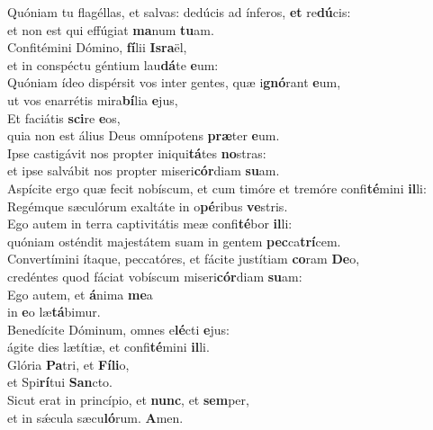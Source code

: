 \evenverse Quóniam tu flagéllas, et salvas: dedúcis ad ínferos, \textbf{et} re\textbf{dú}cis:~\*\\
\evenverse et non est qui effúgiat \textbf{ma}num \textbf{tu}am.\\
\oddverse Confitémini Dómino, \textbf{fí}lii \textbf{Is}\textbf{ra}ël,~\*\\
\oddverse et in conspéctu géntium lau\textbf{dá}te \textbf{e}um:\\
\evenverse Quóniam ídeo dispérsit vos inter gentes, quæ i\textbf{gnó}rant \textbf{e}um,~\*\\
\evenverse ut vos enarrétis mira\textbf{bí}lia \textbf{e}jus,\\
\oddverse Et faciátis \textbf{sci}re \textbf{e}os,~\*\\
\oddverse quia non est álius Deus omnípotens \textbf{præ}ter \textbf{e}um.\\
\evenverse Ipse castigávit nos propter iniqui\textbf{tá}tes \textbf{no}stras:~\*\\
\evenverse et ipse salvábit nos propter miseri\textbf{cór}diam \textbf{su}am.\\
\oddverse Aspícite ergo quæ fecit nobíscum, et cum timóre et tremóre confi\textbf{té}mini \textbf{il}li:~\*\\
\oddverse Regémque sæculórum exaltáte in o\textbf{pé}ribus \textbf{ve}stris.\\
\evenverse Ego autem in terra captivitátis meæ confi\textbf{té}bor \textbf{il}li:~\*\\
\evenverse quóniam osténdit majestátem suam in gentem \textbf{pec}ca\textbf{trí}cem.\\
\oddverse Convertímini ítaque, peccatóres, et fácite justítiam \textbf{co}ram \textbf{De}o,~\*\\
\oddverse credéntes quod fáciat vobíscum miseri\textbf{cór}diam \textbf{su}am:\\
\evenverse Ego autem, et \textbf{á}nima \textbf{me}a~\*\\
\evenverse in \textbf{e}o læ\textbf{tá}bimur.\\
\oddverse Benedícite Dóminum, omnes e\textbf{lé}cti \textbf{e}jus:~\*\\
\oddverse ágite dies lætítiæ, et confi\textbf{té}mini \textbf{il}li.\\
\evenverse Glória \textbf{Pa}tri, et \textbf{Fí}\textbf{li}o,~\*\\
\evenverse et Spi\textbf{rí}tui \textbf{San}cto.\\
\oddverse Sicut erat in princípio, et \textbf{nunc}, et \textbf{sem}per,~\*\\
\oddverse et in sǽcula sæcu\textbf{ló}rum. \textbf{A}men.\\
